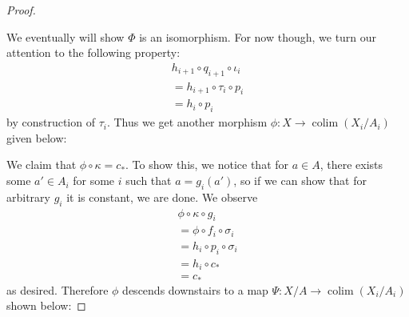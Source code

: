 \documentclass{article}
\DeclareMathOperator{\colim}{colim}
\begin{document}
\begin{proof}
    \begin{center}
    \end{center}
    We eventually will show $\Phi$ is an isomorphism. For now though, we turn our attention to the following property:
    \begin{align*}
        h_{i+1}\circ q_{i+1} \circ \iota_i\\
        =h_{i+1}\circ \tau_i \circ p_i\\
        =h_i\circ p_i
    \end{align*}
    by construction of $\tau_i$. Thus we get another morphism $\phi:X\to \colim (X_i/A_i)$ given below:
    \begin{center}
    \end{center}
    We claim that $\phi \circ \kappa=c_*$. To show this, we notice that for $a\in A$, there exists some $a'\in A_i$ for some $i$ such that $a=g_i(a')$, so if we can show that for arbitrary $g_i$ it is constant, we are done. We observe
    \begin{align*}
        \phi \circ \kappa \circ g_i\\
        = \phi \circ f_i\circ \sigma_i\\
        =h_i\circ p_i\circ \sigma_i\\
        =h_i\circ c_*\\
        =c_*
    \end{align*}
    as desired. Therefore $\phi$ descends downstairs to a map $\Psi:X/A\to \colim(X_i/A_i)$ shown below:

\end{proof}
\end{document}

